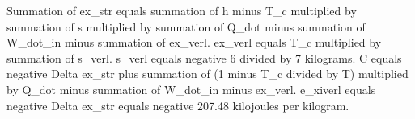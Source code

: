 Summation of ex_str equals summation of h minus T_c multiplied by summation of s multiplied by summation of Q_dot minus summation of W_dot_in minus summation of ex_verl.  
ex_verl equals T_c multiplied by summation of s_verl.  
s_verl equals negative 6 divided by 7 kilograms.  
C equals negative Delta ex_str plus summation of (1 minus T_c divided by T) multiplied by Q_dot minus summation of W_dot_in minus ex_verl.  
e_xiverl equals negative Delta ex_str equals negative 207.48 kilojoules per kilogram.